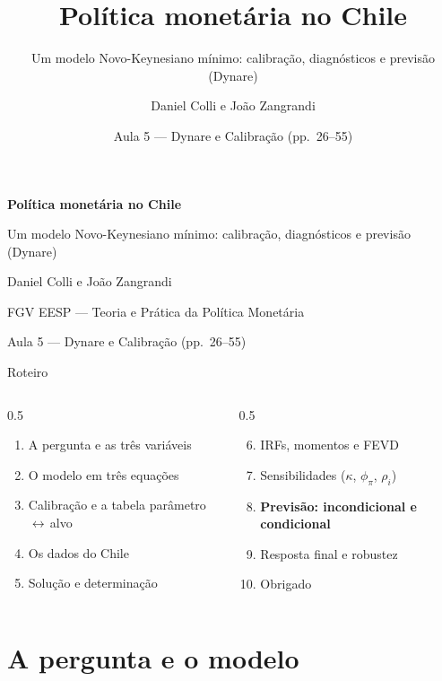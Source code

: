 \documentclass[aspectratio=169,11pt]{beamer}
\title{Política monetária no Chile}
\subtitle{Um modelo Novo-Keynesiano mínimo: calibração, diagnósticos e previsão (Dynare)}
\author{Daniel Colli e João Zangrandi}
\institute{FGV EESP --- Teoria e Prática da Política Monetária}
\date{Aula 5 --- Dynare e Calibração (pp.\ 26--55)}
\begin{document}
\begin{frame}[plain]
  \centering
  \vfill
  {\LARGE\bfseries\color{azul} Política monetária no Chile\par}
  \vspace{5mm}
  {\large Um modelo Novo-Keynesiano mínimo: calibração, diagnósticos e previsão (Dynare)\par}
  \vspace{7mm}
  {\normalsize Daniel Colli e João Zangrandi\par}
  \vspace{2mm}
  {\small FGV EESP --- Teoria e Prática da Política Monetária\par}
  \vspace{5mm}
  {\small Aula 5 --- Dynare e Calibração (pp.\ 26--55)\par}
  \vfill
\end{frame}

\begin{frame}{Roteiro}
  \begin{columns}[T]
    \begin{column}{0.5\textwidth}
      \begin{enumerate}
        \item A pergunta e as três variáveis
        \item O modelo em três equações
        \item Calibração e a tabela parâmetro\,$\leftrightarrow$\,alvo
        \item Os dados do Chile
        \item Solução e determinação
      \end{enumerate}
    \end{column}
    \begin{column}{0.5\textwidth}
      \begin{enumerate}\setcounter{enumi}{5}
        \item IRFs, momentos e FEVD
        \item Sensibilidades ($\kappa$, $\phi_\pi$, $\rho_i$)
        \item \textbf{Previsão: incondicional e condicional}
        \item Resposta final e robustez
        \item Obrigado
      \end{enumerate}
    \end{column}
  \end{columns}
\end{frame}

\section{A pergunta e o modelo}
\end{document}
